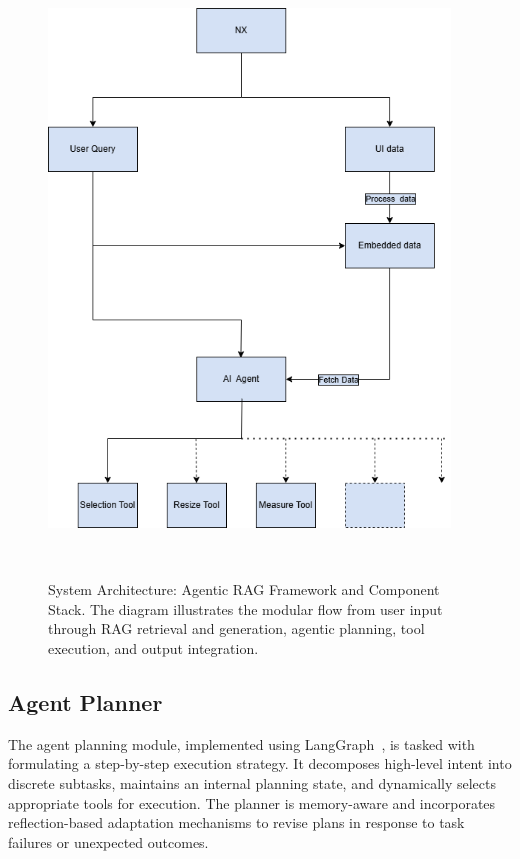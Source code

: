 \begin{figure}[h!]
    \centering
    \includegraphics[width=0.95\textwidth]{images/NX_Diagram.drawio.png}  %
    \caption{System Architecture: Agentic RAG Framework and Component Stack. The diagram illustrates the modular flow from user input through RAG retrieval and generation, agentic planning, tool execution, and output integration.}
    ~\label{fig:agentic_rag}
\end{figure}



\subsection{Agent Planner}
The agent planning module, implemented using LangGraph~\cite{langgraph2024agentai}, is tasked with formulating a step-by-step execution strategy. It decomposes high-level intent into discrete subtasks, maintains an internal planning state, and dynamically selects appropriate tools for execution. The planner is memory-aware and incorporates reflection-based adaptation mechanisms to revise plans in response to task failures or unexpected outcomes.


